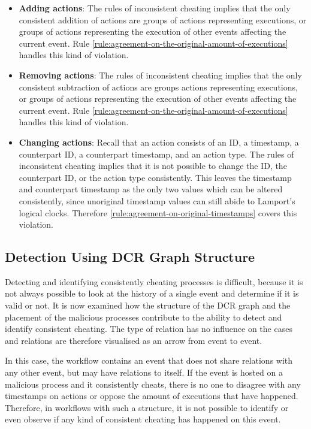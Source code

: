 	\begin{itemize}
		\item \textbf{Adding actions}: The rules of inconsistent cheating implies that the only consistent addition of actions are groups of actions representing executions, or groups of actions representing the execution of other events affecting the current event. Rule  \ref{rule:agreement-on-the-original-amount-of-executions} handles this kind of violation.
		\item \textbf{Removing actions}: The rules of inconsistent cheating implies that the only consistent subtraction of actions are groups actions representing executions, or groups of actions representing the execution of other events affecting the current event. Rule  \ref{rule:agreement-on-the-original-amount-of-executions} handles this kind of violation.
		\item \textbf{Changing actions}: Recall that an action consists of an ID, a timestamp, a counterpart ID, a counterpart timestamp, and an action type. The rules of inconsistent cheating implies that it is not possible to change the ID, the counterpart ID, or the action type consistently. This leaves the timestamp and counterpart timestamp as the only two values which can be altered consistently, since unoriginal timestamp values can still abide to Lamport's logical clocks. Therefore \autoref{rule:agreement-on-original-timestamps} covers this violation.
	\end{itemize}
	
	\subsection{Detection Using DCR Graph Structure}
	Detecting and identifying consistently cheating processes is difficult, because it is not always possible to look at the history of a single event and determine if it is valid or not. It is now examined how the structure of the DCR graph and the placement of the malicious processes contribute to the ability to detect and identify consistent cheating. The type of relation has no influence on the cases and relations are therefore visualised as an arrow from event to event.
	
	\begin{case}
		In this case, the workflow contains an event that does not share relations with any other event, but may have relations to itself. If the event is hosted on a malicious process and it consistently cheats, there is no one to disagree with any timestamps on actions or oppose the amount of executions that have happened. Therefore, in workflows with such a structure, it is not possible to identify or even observe if any kind of consistent cheating has happened on this event. 
		\label{case:malicious-alone}
	\end{case}
	
